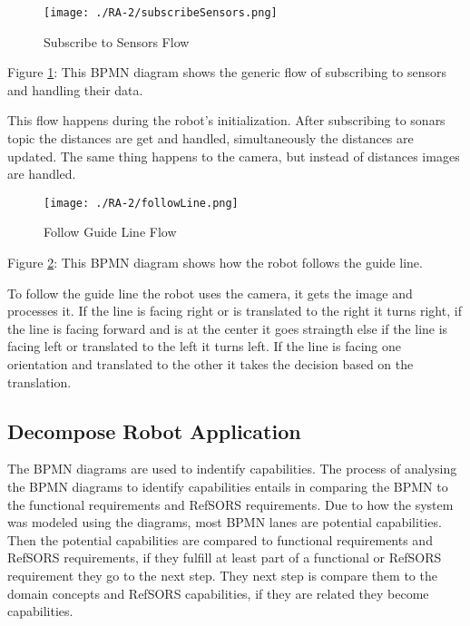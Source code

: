 \begin{figure}[ht!]
 \centering
 \texttt{[image: ./RA-2/subscribeSensors.png]}
 \caption{Subscribe to Sensors Flow}
 \label{fig:subscribeSensors}
\end{figure}

Figure \ref{fig:subscribeSensors}: This BPMN diagram shows the generic flow of subscribing to sensors and handling their data.

This flow happens during the robot's initialization. After subscribing to sonars topic the distances are get and handled, simultaneously the distances are updated. The same thing happens to the camera, but instead of distances images are handled.

\begin{figure}[ht!]
 \centering
 \texttt{[image: ./RA-2/followLine.png]}
 \caption{Follow Guide Line Flow}
 \label{fig:followline}
\end{figure}

Figure \ref{fig:followline}: This BPMN diagram shows how the robot follows the guide line.

To follow the guide line the robot uses the camera, it gets the image and processes it. If the line is facing right or is translated to the right it turns right, if the line is facing forward and is at the center it goes straingth else if the line is facing left or translated to the left it turns left. If the line is facing one orientation and translated to the other it takes the decision based on the translation.

\subsection{Decompose Robot Application}

The BPMN diagrams are used to indentify capabilities. The process of analysing the BPMN diagrams to identify capabilities entails in comparing the BPMN to the functional requirements and RefSORS requirements. Due to how the system was modeled using the diagrams, most BPMN lanes are potential capabilities. Then the potential capabilities are compared to functional requirements and RefSORS requirements, if they fulfill at least part of a functional or RefSORS requirement they go to the next step. They next step is compare them to the domain concepts and RefSORS capabilities, if they are related they become capabilities.

